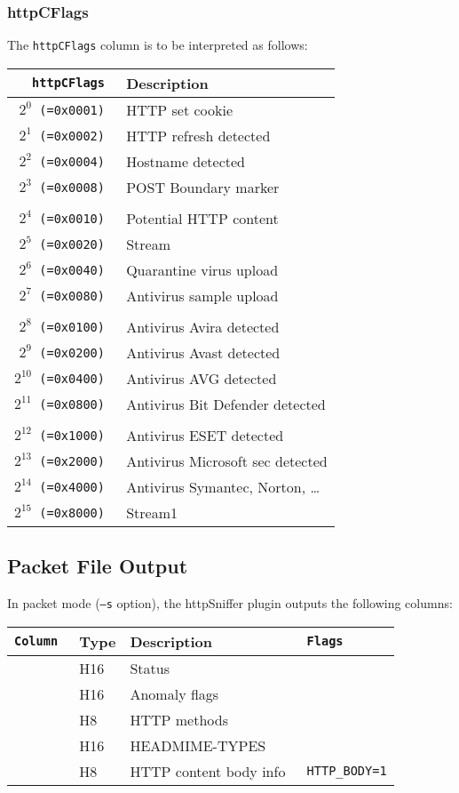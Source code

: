 \documentclass[documentation]{subfiles}
\begin{document}
\subsubsection{httpCFlags}\label{httpCFlags}
The {\tt httpCFlags} column is to be interpreted as follows:
\begin{longtable}{>{\tt}rl}
    \toprule
    {\bf httpCFlags} & {\bf Description}\\
    \midrule\endhead%
    $2^{0}$  (=0x0001) & HTTP set cookie\\
    $2^{1}$  (=0x0002) & HTTP refresh detected\\
    $2^{2}$  (=0x0004) & Hostname detected\\
    $2^{3}$  (=0x0008) & POST Boundary marker\\
    \\
    $2^{4}$  (=0x0010) & Potential HTTP content\\
    $2^{5}$  (=0x0020) & Stream\\
    $2^{6}$  (=0x0040) & Quarantine virus upload\\
    $2^{7}$  (=0x0080) & Antivirus sample upload\\
    \\
    $2^{8}$  (=0x0100) & Antivirus Avira detected\\
    $2^{9}$  (=0x0200) & Antivirus Avast detected\\
    $2^{10}$ (=0x0400) & Antivirus AVG detected\\
    $2^{11}$ (=0x0800) & Antivirus Bit Defender detected\\
    \\
    $2^{12}$ (=0x1000) & Antivirus ESET detected\\
    $2^{13}$ (=0x2000) & Antivirus Microsoft sec detected\\
    $2^{14}$ (=0x4000) & Antivirus Symantec, Norton, \ldots\\
    $2^{15}$ (=0x8000) & Stream1\\
    \bottomrule
\end{longtable}

\subsection{Packet File Output}
In packet mode ({\tt --s} option), the httpSniffer plugin outputs the following columns:
\begin{longtable}{>{\tt}lll>{\tt\small}l}
    \toprule
    {\bf Column} & {\bf Type} & {\bf Description} & {\bf Flags}\\
    \midrule\endhead%
    \nameref{httpStat}        & H16   & Status                 & \\
    \nameref{httpAFlags}      & H16   & Anomaly flags          & \\
    \nameref{httpMethods}     & H8    & HTTP methods           & \\
    \nameref{httpHeadMimes}   & H16   & HEADMIME-TYPES         & \\
    \nameref{httpCFlags}      & H8    & HTTP content body info & HTTP\_BODY=1\\
    \bottomrule
\end{longtable}
\end{document}
